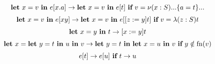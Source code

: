 \[\begin{array}{c}
    \textbf{let}\ x = v\ \textbf{in}\ e[x.a] \rightarrow \textbf{let}\ x = v\ \textbf{in}\ e[t]
        \ \textbf{if}\  v = \nu(x:S)...\{a = t\}... \\[2mm]
    \textbf{let}\ x = v\ \textbf{in}\ e[x y] \rightarrow \textbf{let}\ x = v\ \textbf{in}\ e[[z := y]t]
        \ \textbf{if}\  v = \lambda(z:S)t \\[2mm]
    \textbf{let}\ x = y\ \textbf{in}\ t \rightarrow [x := y]{t} \\[2mm]
    \textbf{let}\ x = \textbf{let}\ y = t\ \textbf{in}\ u\ \textbf{in}\ v \rightarrow \textbf{let}\ y = t\ \textbf{in}\ \textbf{let}\ x = u\ \textbf{in}\ v
        \ \textbf{if}\  y \notin \text{fn}(v) \\[2mm]
    e[t] \rightarrow e[u] \ \textbf{if}\  t \rightarrow u
\end{array}\]
